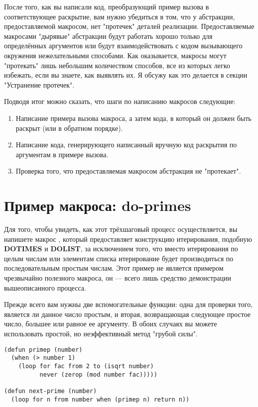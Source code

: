 После того, как вы написали код, преобразующий пример вызова в соответствующее раскрытие,
вам нужно убедиться в том, что у абстракции, предоставляемой макросом, нет "протечек"
деталей реализации. Предоставляемые макросами "дырявые" абстракции будут работать хорошо
только для определённых аргументов или будут взаимодействовать с кодом вызывающего
окружения нежелательными способами. Как оказывается, макросы могут "протекать" лишь
небольшим количеством способов, все из которых легко избежать, если вы знаете, как
выявлять их. Я обсужу как это делается в секции "Устранение протечек".

Подводя итог можно сказать, что шаги по написанию макросов следующие:

\begin{enumerate}
\item Написание примера вызова макроса, а затем кода, в который он должен быть раскрыт
  (или в обратном порядке).
  
\item Написание кода, генерирующего написанный вручную код раскрытия по аргументам в
  примере вызова.

\item Проверка того, что предоставляемая макросом абстракция не "протекает".
\end{enumerate}

\section{Пример макроса: do-primes}

Для того, чтобы увидеть, как этот трёхшаговый процесс осуществляется, вы напишете макрос
, который предоставляет конструкцию итерирования, подобную
\textbf{DOTIMES} и \textbf{DOLIST}, за исключением того, что вместо итерирования по целым
числам или элементам списка итерирование будет производиться по последовательным простым
числам. Этот пример не является примером чрезвычайно полезного макроса, он --- всего лишь
средство демонстрации вышеописанного процесса.

Прежде всего вам нужны две вспомогательные функции: одна для проверки того, является ли
данное число простым, и вторая, возвращающая следующее простое число, большее или равное
ее аргументу. В обоих случаях вы можете использовать простой, но неэффективный метод
"грубой силы".

\begin{lstlisting}
(defun primep (number)
  (when (> number 1)
    (loop for fac from 2 to (isqrt number) 
          never (zerop (mod number fac)))))

(defun next-prime (number)
  (loop for n from number when (primep n) return n))
\end{lstlisting}

